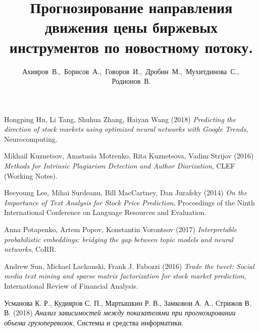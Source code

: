 \documentclass[12pt, twoside]{article}
\title
    [Прогнозирование направления движения цены биржевых инструментов по новостному потоку ] %
    {Прогнозирование направления движения цены биржевых инструментов по новостному потоку.}
\author
    {Ахияров~В.,\, Борисов~А.,\, Говоров~И.,\, Дробин~М.,\, Мухитдинова~С.,\, Родионов~В. } %
\begin{document}
\maketitle

\begin{thebibliography}{9}
Hongping Hu, Li Tang, Shuhua Zhang, Haiyan Wang (2018) \emph{Predicting the direction of stock markets using optimized neural networks with Google Trends}, Neurocomputing.

Mikhail Kuznetsov, Anastasia Motrenko, Rita Kuznetsova, Vadim Strijov (2016) \emph{Methods for Intrinsic Plagiarism Detection and Author Diarization}, CLEF (Working Notes).

Heeyoung Lee, Mihai Surdeanu, Bill MacCartney, Dan Jurafsky (2014) \emph{On the Importance of Text Analysis for Stock Price Prediction}, Proceedings of the Ninth International Conference on Language Resources and Evaluation.

Anna Potapenko, Artem Popov, Konstantin Vorontsov (2017) \emph{Interpretable probabilistic embeddings: bridging the gap between topic models and neural networks}, CoRR.

Andrew Sun, Michael Lachanski, Frank J. Fabozzi (2016) \emph{Trade the tweet: Social media text mining and sparse matrix factorization for stock market prediction}, International Review of Financial Analysis.

Усманова К. Р., Кудияров С. П., Мартышкин Р. В., Замковои А. А., Стрижов В. В. (2018) \emph{Анализ зависимостей между показателями при прогнозировании объема грузоперевозок}, Системы и средства информатики.
\end{thebibliography}
\end{document}
